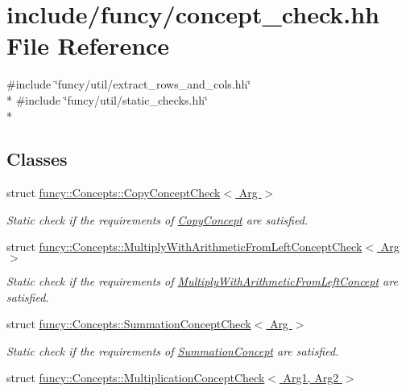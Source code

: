 \hypertarget{concept__check_8hh}{\section{include/funcy/concept\-\_\-check.hh File Reference}
\label{concept__check_8hh}
}
{\ttfamily \#include \char`\"{}funcy/util/extract\-\_\-rows\-\_\-and\-\_\-cols.\-hh\char`\"{}}\\*
{\ttfamily \#include \char`\"{}funcy/util/static\-\_\-checks.\-hh\char`\"{}}\\*
\subsection*{Classes}
\begin{DoxyCompactItemize}
\item 
struct \hyperlink{structfuncy_1_1Concepts_1_1CopyConceptCheck}{funcy\-::\-Concepts\-::\-Copy\-Concept\-Check$<$ Arg $>$}
\begin{DoxyCompactList}\small\item\em Static check if the requirements of \hyperlink{structfuncy_1_1Concepts_1_1CopyConcept}{Copy\-Concept} are satisfied. \end{DoxyCompactList}\item 
struct \hyperlink{structfuncy_1_1Concepts_1_1MultiplyWithArithmeticFromLeftConceptCheck}{funcy\-::\-Concepts\-::\-Multiply\-With\-Arithmetic\-From\-Left\-Concept\-Check$<$ Arg $>$}
\begin{DoxyCompactList}\small\item\em Static check if the requirements of \hyperlink{structfuncy_1_1Concepts_1_1MultiplyWithArithmeticFromLeftConcept}{Multiply\-With\-Arithmetic\-From\-Left\-Concept} are satisfied. \end{DoxyCompactList}\item 
struct \hyperlink{structfuncy_1_1Concepts_1_1SummationConceptCheck}{funcy\-::\-Concepts\-::\-Summation\-Concept\-Check$<$ Arg $>$}
\begin{DoxyCompactList}\small\item\em Static check if the requirements of \hyperlink{structfuncy_1_1Concepts_1_1SummationConcept}{Summation\-Concept} are satisfied. \end{DoxyCompactList}\item 
struct \hyperlink{structfuncy_1_1Concepts_1_1MultiplicationConceptCheck}{funcy\-::\-Concepts\-::\-Multiplication\-Concept\-Check$<$ Arg1, Arg2 $>$}

\end{DoxyCompactItemize}
